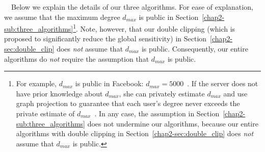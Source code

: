 \smallskip
{}~~Below we explain the details of our three algorithms.
For ease of explanation, we assume that the maximum degree $d_{max}$ is public in Section~\ref{chap2-sub:three_algorithms}\footnote{For example, $d_{max}$ is public in Facebook: $d_{max} = 5000$~\cite{Facebook_Limit}.
If the server does not have prior knowledge about $d_{max}$, she can privately estimate $d_{max}$ and use graph projection to guarantee that each user's degree never exceeds the private estimate of $d_{max}$~\cite{Imola_USENIX21}.
In any case, the assumption in Section~\ref{chap2-sub:three_algorithms} does not undermine our algorithms, because our entire algorithms with double clipping in Section~\ref{chap2-sec:double_clip} does \textit{not} assume that $d_{max}$ is public.}.
Note, however, that
our double clipping (which is proposed to significantly reduce the global sensitivity) in Section~\ref{chap2-sec:double_clip} does \textit{not} assume that $d_{max}$ is public.
Consequently, our entire algorithms 
do \textit{not} require the assumption that $d_{max}$ is public.


